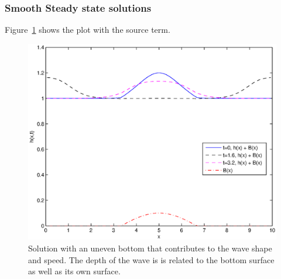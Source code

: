 

\subsubsection{Smooth Steady state solutions} 

\label{subsub:smooth_steady_state_solutions}

Figure~\ref{fig:Figures_steadySolutionsp1_n_is_80_a_0} shows the plot with the source term.
\begin{figure}
	[htbp] \centering 
	\includegraphics[width=\MyWidth]{Figures/steadySolutionsp1_n_is_80_a_0.eps} \caption{Solution with an uneven bottom that contributes to the wave shape and speed. The depth of the wave is is related to the bottom surface as well as its own surface.} \label{fig:Figures_steadySolutionsp1_n_is_80_a_0} 
\end{figure}


